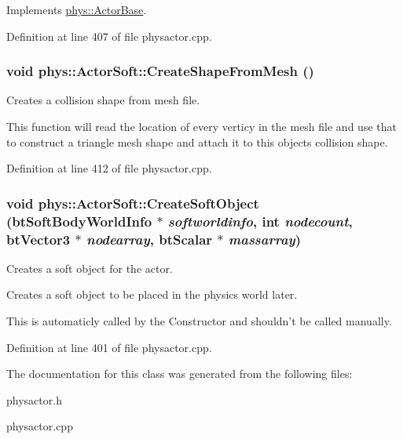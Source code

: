 Implements \hyperlink{classphys_1_1ActorBase_ac5d4ad5a634b16000742f506ed5957fb}{phys::ActorBase}.



Definition at line 407 of file physactor.cpp.

\hypertarget{classphys_1_1ActorSoft_a51d78e0f503c3c815511c3d246b426ae}{
\subsubsection[{CreateShapeFromMesh}]{\setlength{\rightskip}{0pt plus 5cm}void phys::ActorSoft::CreateShapeFromMesh ()}}
\label{d4/d23/classphys_1_1ActorSoft_a51d78e0f503c3c815511c3d246b426ae}


Creates a collision shape from mesh file. 

This function will read the location of every verticy in the mesh file and use that to construct a triangle mesh shape and attach it to this objects collision shape. 

Definition at line 412 of file physactor.cpp.

\hypertarget{classphys_1_1ActorSoft_a04c98bb0ab9ed7c1dfc3435d49403ef4}{
\subsubsection[{CreateSoftObject}]{\setlength{\rightskip}{0pt plus 5cm}void phys::ActorSoft::CreateSoftObject (btSoftBodyWorldInfo $\ast$ {\em softworldinfo}, \/  int {\em nodecount}, \/  btVector3 $\ast$ {\em nodearray}, \/  btScalar $\ast$ {\em massarray})}}
\label{d4/d23/classphys_1_1ActorSoft_a04c98bb0ab9ed7c1dfc3435d49403ef4}


Creates a soft object for the actor. 

Creates a soft object to be placed in the physics world later. \par
 This is automaticly called by the Constructor and shouldn't be called manually. 

Definition at line 401 of file physactor.cpp.



The documentation for this class was generated from the following files:\begin{DoxyCompactItemize}
\item 
physactor.h\item 
physactor.cpp\end{DoxyCompactItemize}
